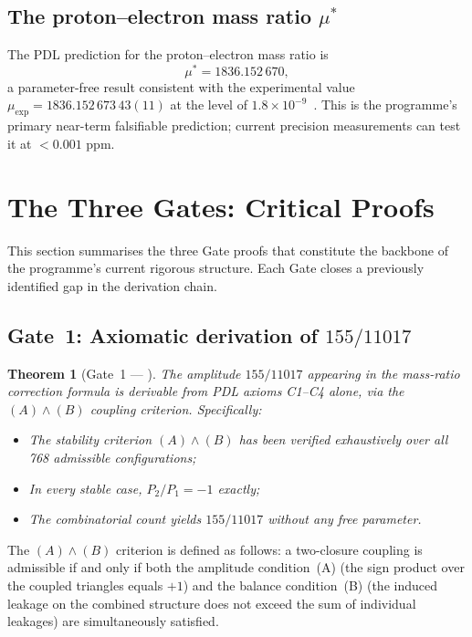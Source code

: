 \documentclass[11pt,a4paper]{article}
\theoremstyle{plain}
\newtheorem{theorem}{Theorem}[section]
\theoremstyle{definition}
\theoremstyle{remark}
\newcommand{\mustar}{\mu^*}
\begin{document}
\subsection{The proton--electron mass ratio \texorpdfstring{$\mustar$}{mu*}}
\label{subsec:mu}

The PDL prediction for the proton--electron mass ratio is
\[
\mustar = 1836.152\,670,
\]
a parameter-free result consistent with the experimental value $\mu_{\exp}=1836.152\,673\,43(11)$ at the level of $1.8\times 10^{-9}$~\citep{D28,D29,D30}.
This is the programme's primary near-term falsifiable prediction; current precision measurements can test it at $<0.001$ ppm.

\section{The Three Gates: Critical Proofs}
\label{sec:gates}

This section summarises the three Gate proofs that constitute the backbone of the programme's current rigorous structure.
Each Gate closes a previously identified gap in the derivation chain.

\subsection{Gate~1: Axiomatic derivation of \texorpdfstring{$155/11017$}{155/11017}}
\label{subsec:gate1}

\begin{theorem}[Gate~1 — \citep{D29}]
\label{thm:Gate1}
The amplitude $155/11017$ appearing in the mass-ratio correction formula is derivable from PDL axioms C1--C4 alone, via the $(A)\wedge(B)$ coupling criterion.
Specifically:
\begin{itemize}
\item The stability criterion $(A)\wedge(B)$ has been verified exhaustively over all 768 admissible configurations;
\item In every stable case, $P_2/P_1 = -1$ exactly;
\item The combinatorial count yields $155/11017$ without any free parameter.
\end{itemize}
\end{theorem}

The $(A)\wedge(B)$ criterion is defined as follows: a two-closure coupling is admissible if and only if both the amplitude condition~(A) (the sign product over the coupled triangles equals $+1$) and the balance condition~(B) (the induced leakage on the combined structure does not exceed the sum of individual leakages) are simultaneously satisfied.
\end{document}
